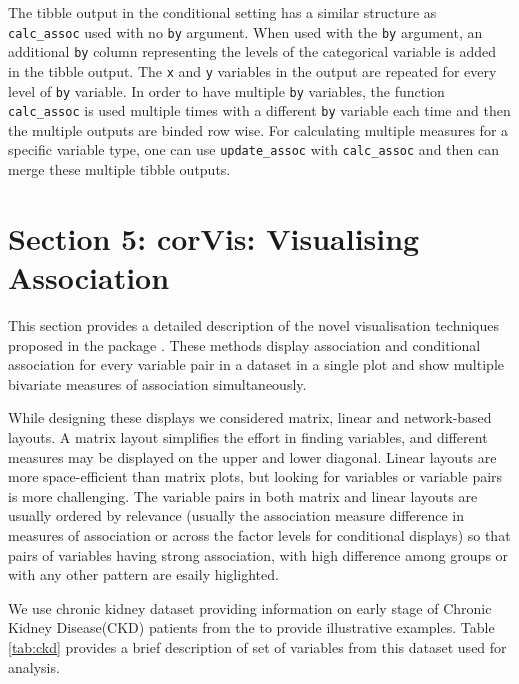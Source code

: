 The tibble output in the conditional setting has a similar structure as
\texttt{calc\_assoc} used with no \texttt{by} argument. When used with
the \texttt{by} argument, an additional \texttt{by} column representing
the levels of the categorical variable is added in the tibble output.
The \texttt{x} and \texttt{y} variables in the output are repeated for
every level of \texttt{by} variable. In order to have multiple
\texttt{by} variables, the function \texttt{calc\_assoc} is used
multiple times with a different \texttt{by} variable each time and then
the multiple outputs are binded row wise. For calculating multiple
measures for a specific variable type, one can use
\texttt{update\_assoc} with \texttt{calc\_assoc} and then can merge
these multiple tibble outputs.

\hypertarget{section-5-corvis-visualising-association}{%
\section{Section 5: corVis: Visualising
Association}\label{section-5-corvis-visualising-association}}

This section provides a detailed description of the novel visualisation
techniques proposed in the package . These methods
display association and conditional association for every variable pair
in a dataset in a single plot and show multiple bivariate measures of
association simultaneously.

While designing these displays we considered matrix, linear and
network-based layouts. A matrix layout simplifies the effort in finding
variables, and different measures may be displayed on the upper and
lower diagonal. Linear layouts are more space-efficient than matrix
plots, but looking for variables or variable pairs is more challenging.
The variable pairs in both matrix and linear layouts are usually ordered
by relevance (usually the association measure difference in measures of
association or across the factor levels for conditional displays) so
that pairs of variables having strong association, with high difference
among groups or with any other pattern are esaily higlighted.

We use chronic kidney dataset providing information on early stage of
Chronic Kidney Disease(CKD) patients from the \citep{Dua:2019} to
provide illustrative examples. Table \ref{tab:ckd} provides a brief
description of set of variables from this dataset used for analysis.

